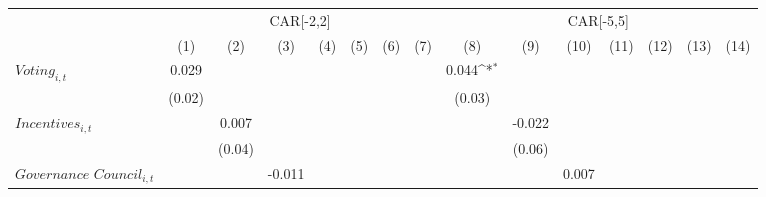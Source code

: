 {
\def\sym#1{\ifmmode^{#1}\else\(^{#1}\)\fi}
\begin{tabular}{l*{14}{c}}
\toprule
                    &\multicolumn{7}{c}{CAR[-2,2]}                                                                                                                            &\multicolumn{7}{c}{CAR[-5,5]}                                                                                                                            \\\cmidrule(lr){2-8}\cmidrule(lr){9-15}
                    &\multicolumn{1}{c}{(1)}         &\multicolumn{1}{c}{(2)}         &\multicolumn{1}{c}{(3)}         &\multicolumn{1}{c}{(4)}         &\multicolumn{1}{c}{(5)}         &\multicolumn{1}{c}{(6)}         &\multicolumn{1}{c}{(7)}         &\multicolumn{1}{c}{(8)}         &\multicolumn{1}{c}{(9)}         &\multicolumn{1}{c}{(10)}         &\multicolumn{1}{c}{(11)}         &\multicolumn{1}{c}{(12)}         &\multicolumn{1}{c}{(13)}         &\multicolumn{1}{c}{(14)}         \\
\midrule
$\textit{Voting}_{i,t}$&       0.029         &                     &                     &                     &                     &                     &                     &       0.044\sym{*}  &                     &                     &                     &                     &                     &                     \\
                    &      (0.02)         &                     &                     &                     &                     &                     &                     &      (0.03)         &                     &                     &                     &                     &                     &                     \\
$\textit{Incentives}_{i,t}$&                     &       0.007         &                     &                     &                     &                     &                     &                     &      -0.022         &                     &                     &                     &                     &                     \\
                    &                     &      (0.04)         &                     &                     &                     &                     &                     &                     &      (0.06)         &                     &                     &                     &                     &                     \\
$\textit{Governance Council}_{i,t}$&                     &                     &      -0.011         &                     &                     &                     &                     &                     &                     &       0.007         &                     &                     &                     &                     \\

\end{tabular}}
